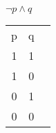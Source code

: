 \documentclass{article}
\begin{document}
$\neg p\land q$ \\
\begin{tabular}{|c|c|c|}
\hline
p & q \\
1 & 1 \\
1 & 0 \\
0 & 1 \\
0 & 0 \\
\hline

\end{tabular}
\end{document}
